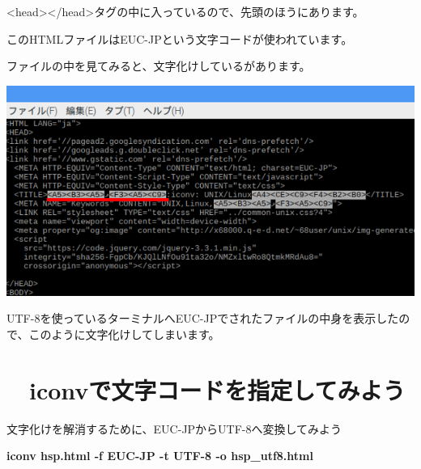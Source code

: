 {\textless}head{\textgreater}{\textless}/head{\textgreater}タグの中に入っているので、先頭のほうにあります。

このHTMLファイルはEUC-JPという文字コードが使われています。

ファイルの中を見てみると、文字化けしているがあります。



\begin{center}
\includegraphics[width=\textwidth]{./text08-img/textbook-img021-2.png}

\end{center}
UTF-8を使っているターミナルへEUC-JPでされたファイルの中身を表示したので、このように文字化けしてしまいます。


\bigskip

\clearpage\section{\theExercise　iconvで文字コードを指定してみよう}
\addtocounter{Exercise}{-1}\label{E:iconv2}

文字化けを解消するために、EUC-JPからUTF-8へ変換してみよう

\textbf{iconv hsp.html -f EUC-JP -t UTF-8 -o hsp\_utf8.html}


